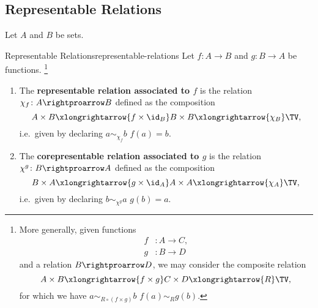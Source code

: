 \subsection{Representable Relations}\label{subsection-representable-relations}
Let $A$ and $B$ be sets.
\begin{definition}{Representable Relations}{representable-relations}%
    Let $f\colon A\to B$ and $g\colon B\to A$ be functions.%
    \footnote{%
        More generally, given functions
        \begin{align*}
            f &\colon A \to C,\\
            g &\colon B \to D
        \end{align*}
        and a relation $B\rightproarrow D$, we may consider the composite relation
        \[
            A\times B%
            \xlongrightarrow{f\times g}%
            C\times D%
            \xlongrightarrow{R}%
            \TV,%
        \]%
        for which we have $a\sim_{R\circ(f\times g)}b$ \textiff $f(a)\sim_{R}g(b)$.
        \par\vspace*{-1.75\baselineskip}
    }%
    \begin{enumerate}
        \item\label{representable-relations-representable-relations}The \textbf{representable relation associated to $f$} is the relation $\chi_{f}\colon A\rightproarrow B$ defined as the composition%
            \[
                A\times B%
                \xlongrightarrow{f\times\id_{B}}%
                B\times B%
                \xlongrightarrow{\chi_{B}}%
                \TV,%
            \]%
            i.e.\ given by declaring $a\sim_{\chi_{f}}b$ \textiff $f(a)=b$.
        \item\label{representable-relations-corepresentable-relations}The \textbf{corepresentable relation associated to $g$} is the relation $\chi^{g}\colon B\rightproarrow A$ defined as the composition%
            \[
                B\times A%
                \xlongrightarrow{g\times\id_{A}}%
                A\times A%
                \xlongrightarrow{\chi_{A}}%
                \TV,%
            \]%
            i.e.\ given by declaring $b\sim_{\chi^{g}}a$ \textiff $g(b)=a$.
    \end{enumerate}
\end{definition}
